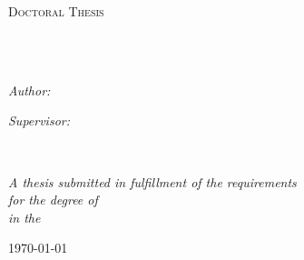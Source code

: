 \documentclass[
12pt, %
english, %
onehalfspacing, %
nohyperref, %
headsepline, %
]{MastersDoctoralThesis} %
\author{Vsevolod \textsc{Nedora}} %
\begin{document}
\frontmatter %

\pagestyle{plain} %


\begin{titlepage}
\begin{center}

\vspace*{.06\textheight}
{\scshape\LARGE \univname\par}\vspace{1.5cm} %
\textsc{\Large Doctoral Thesis}\\[0.5cm] %

\HRule \\[0.4cm] %
{\huge \bfseries \ttitle\par}\vspace{0.4cm} %
\HRule \\[1.5cm] %
 
\begin{minipage}[t]{0.4\textwidth}
\begin{flushleft} \large
\emph{Author:}\\
\href{http://www.johnsmith.com}{\authorname} %
\end{flushleft}
\end{minipage}
\begin{minipage}[t]{0.4\textwidth}
\begin{flushright} \large
\emph{Supervisor:} \\
\href{http://www.jamessmith.com}{\supname} %
\end{flushright}
\end{minipage}\\[3cm]
 
\vfill

\large \textit{A thesis submitted in fulfillment of the requirements\\ for the degree of \degreename}\\[0.3cm] %
\textit{in the}\\[0.4cm]
 
\vfill

{\large \today}\\[4cm] %
 
\vfill
\end{center}
\end{titlepage}
\end{document}
